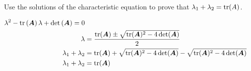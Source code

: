 Use the solutions of the characteristic equation to prove that $\lambda_1 + \lambda_2 = \operatorname{tr}(A)$.

\begin{solution}
    \begin{align*}
        \lambda^2 - \operatorname{tr}\left(\boldsymbol{A}\right)\lambda + \det\left(\boldsymbol{A}\right) = 0 \\
        \lambda &= \frac{\operatorname{tr}(\boldsymbol{A}) \pm \sqrt{\operatorname{tr}(\boldsymbol{A})^2 - 4\det(\boldsymbol{A})}}{2} \\
        \lambda_1 + \lambda_2 &= \operatorname{tr}(\boldsymbol{A}) + \sqrt{\operatorname{tr}(\boldsymbol{A})^2 - 4\det(\boldsymbol{A})} - \sqrt{\operatorname{tr}(\boldsymbol{A})^2 - 4\det(\boldsymbol{A})} \\
        \lambda_1 + \lambda_2 &= \operatorname{tr}(\boldsymbol{A})
    \end{align*}
\end{solution}